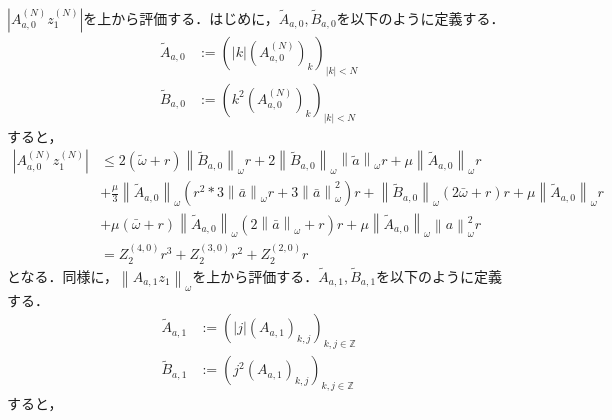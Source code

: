 \documentclass[11pt,a4paper,titlepage]{jsreport}
\theoremstyle{definition}
\begin{document}
$\left| A_{a,0}^{(N)} z_1^{(N)} \right|$を上から評価する．はじめに，$\tilde{A}_{a,0}, \tilde{B}_{a,0}$を以下のように定義する．
\begin{align*}
  \tilde{A}_{a,0} & := \left( \left| k \right| \left( A_{a,0}^{(N)} \right)_k \right)_{|k|<N} \\
  \tilde{B}_{a,0} & := \left( k^2 \left( A_{a,0}^{(N)} \right)_k \right)_{|k|<N}
\end{align*}
すると，
\begin{equation*}
  \begin{split}
    \left| A_{a,0}^{(N)} z_1^{(N)} \right| &\leq 2\left(\tilde{\omega} + r\right) \left\| \tilde{B}_{a,0} \right\|_\omega r + 2 \left\| \tilde{B}_{a,0} \right\|_\omega \left\| \tilde{a} \right\|_\omega r + \mu \left\| \tilde{A}_{a,0} \right\|_\omega r \\
    &+ \frac{\mu}{3} \left\| \tilde{A}_{a,0} \right\|_\omega \left( r^2 * 3 \left\| \bar{a} \right\|_\omega r + 3 \left\| \bar{a} \right\|^2_\omega \right) r + \left\| \tilde{B}_{a,0} \right\|_\omega \left( 2\bar{\omega} + r\right)r + \mu \left\| \tilde{A}_{a,0} \right\|_\omega r \\
    &+ \mu\left(\bar{\omega}+r\right)\left\| \tilde{A}_{a,0} \right\|_\omega \left( 2 \left\| \bar{a} \right\|_{\omega} + r\right)r + \mu \left\| \tilde{A}_{a,0} \right\|_\omega \left\| a \right\|_\omega^2 r\\
    &= Z_2^{(4,0)} r^3 + Z_2^{(3,0)} r^2 + Z_2^{(2,0)} r
  \end{split}
\end{equation*}
となる．同様に，$\left\| A_{a,1} z_1 \right\|_\omega$を上から評価する．$\tilde{A}_{a,1}, \tilde{B}_{a,1}$を以下のように定義する．
\begin{align*}
  \tilde{A}_{a,1} & := \left( \left| j \right| \left( A_{a,1} \right)_{k,j} \right)_{k,j\in\mathbb{Z}} \\
  \tilde{B}_{a,1} & := \left( j^2 \left( A_{a,1} \right)_{k,j} \right)_{k,j\in\mathbb{Z}}
\end{align*}
すると，
\end{document}

